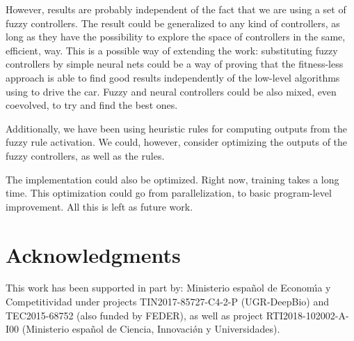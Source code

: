 \documentclass[10pt,journal,compsoc]{IEEEtran}
\begin{document}
However, results are probably independent of the fact that we are using a
set of fuzzy controllers. The result could be generalized to any kind
of controllers, as long as they have the possibility to explore the
space of controllers in the same, efficient, way. This is a possible
way of extending the work: substituting fuzzy controllers by simple
neural nets could be a way of proving that the fitness-less approach
is able to find good results independently of the low-level algorithms
using to drive the car. Fuzzy and neural controllers could be also
mixed, even coevolved, to try and find the best ones. 

Additionally, we have been using heuristic rules for computing outputs
from the fuzzy rule activation. We could, however, consider optimizing
the outputs of the fuzzy controllers, as well as the rules.

The implementation could also be optimized. Right now, training takes
a long time. This optimization could go from parallelization, to basic
program-level improvement. All this is left as future work.



\section*{Acknowledgments}

This work has been supported in part by: Ministerio espa\~{n}ol de
Econom\'{\i}a y Competitividad under projects  TIN2017-85727-C4-2-P (UGR-DeepBio) and TEC2015-68752 (also funded by FEDER), as well as project RTI2018-102002-A-I00 (Ministerio espa\~{n}ol de Ciencia, Innovaci\'{\o}n y Universidades).












\end{document}
